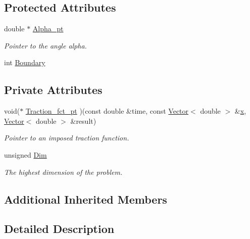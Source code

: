 \subsection*{Protected Attributes}
\begin{DoxyCompactItemize}
\item 
double $\ast$ \hyperlink{classoomph_1_1PolarStressIntegralElement_a0e3f523dbdcda0f50f4436f6cd590b94}{Alpha\+\_\+pt}
\begin{DoxyCompactList}\small\item\em Pointer to the angle alpha. \end{DoxyCompactList}\item 
int \hyperlink{classoomph_1_1PolarStressIntegralElement_a76f229a58be2858c8c61200a470f410f}{Boundary}
\end{DoxyCompactItemize}
\subsection*{Private Attributes}
\begin{DoxyCompactItemize}
\item 
void($\ast$ \hyperlink{classoomph_1_1PolarStressIntegralElement_a481b846bd88c323325eb64cc9b77eaa1}{Traction\+\_\+fct\+\_\+pt} )(const double \&time, const \hyperlink{classoomph_1_1Vector}{Vector}$<$ double $>$ \&\hyperlink{classoomph_1_1PolarStressIntegralElement_accc1886b4e4d60b19046e11484e5d09d}{x}, \hyperlink{classoomph_1_1Vector}{Vector}$<$ double $>$ \&result)
\begin{DoxyCompactList}\small\item\em Pointer to an imposed traction function. \end{DoxyCompactList}\item 
unsigned \hyperlink{classoomph_1_1PolarStressIntegralElement_ae38e4f55fe5517c9a4e7480456b99e46}{Dim}
\begin{DoxyCompactList}\small\item\em The highest dimension of the problem. \end{DoxyCompactList}\end{DoxyCompactItemize}
\subsection*{Additional Inherited Members}


\subsection{Detailed Description}
